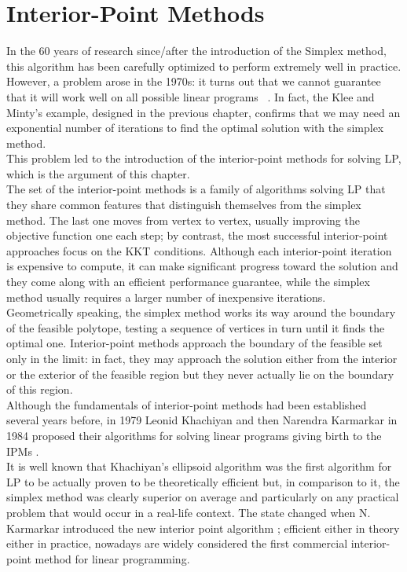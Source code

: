 \documentclass[a4paper,10 pt,titlepage,twoside]{book}
\theoremstyle{plain}
\theoremstyle{definition}
\theoremstyle{remark}
\begin{document}
\chapter{Interior-Point Methods}
In the 60 years of research since/after the introduction of the Simplex method, this algorithm has been carefully optimized to perform extremely well in practice. However, a problem arose in the 1970s: it turns out that we cannot guarantee that it will work well on all possible linear programs ~\cite{MINTY}.
In fact, the Klee and Minty's example, designed in the previous chapter, confirms that we may need an exponential number of iterations to find the optimal solution with the simplex method. \\
This problem led to the introduction of the interior-point methods for solving LP, which is the argument of this chapter.\\
The set of the interior-point methods is a family of algorithms solving LP that they share common features that distinguish themselves from the simplex method. The last one moves from vertex to vertex, usually improving the objective function
one each step; by contrast, the most successful interior-point approaches focus on the KKT conditions. Although each interior-point iteration is expensive to compute, it can make significant progress toward the solution and they come along with an efficient performance guarantee, while the simplex method usually requires a larger number of inexpensive iterations.\\
Geometrically speaking, the simplex method works its way around
the boundary of the feasible polytope, testing a sequence of vertices in turn until it finds the
optimal one. Interior-point methods approach the boundary of the feasible set only in the
limit: in fact, they may approach the solution either from the interior or the exterior of the feasible
region but they never actually lie on the boundary of this region.\\
Although the fundamentals of interior-point methods had been established several years
before, in 1979 Leonid Khachiyan and then Narendra Karmarkar in 1984 proposed their algorithms for solving linear programs giving birth to the IPMs \cite{WWW}. \\It is well known that Khachiyan’s ellipsoid algorithm was the first algorithm for LP to be actually proven to
be theoretically efficient but, in comparison to it, the simplex method was clearly superior on average and particularly on any practical
problem that would occur in a real-life context. The state changed when N. Karmarkar introduced the new interior point algorithm \cite{Kar}; efficient either in theory either in practice, nowadays are widely considered the first commercial interior-point
method for linear programming.\\
\end{document}
